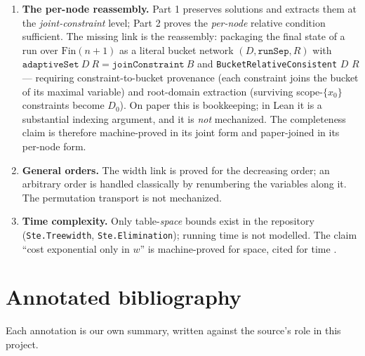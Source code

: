 \documentclass[11pt]{article}
\newcommand{\ste}[1]{\texttt{#1}}
\begin{document}
\begin{enumerate}
\item \textbf{The per-node reassembly.} Part 1 preserves solutions and
  extracts them at the \emph{joint-constraint} level; Part 2 proves
  the \emph{per-node} relative condition sufficient. The missing link
  is the reassembly: packaging the final state of a run over
  $\mathrm{Fin}(n{+}1)$ as a literal bucket network $(D, \ste{runSep},
  R)$ with $\ste{adaptiveSet}\ D\ R = \ste{joinConstraint}\ B$ and
  \ste{BucketRelativeConsistent} $D$ $R$ --- requiring
  constraint-to-bucket provenance (each constraint joins the bucket of
  its maximal variable) and root-domain extraction (surviving
  scope-$\{x_0\}$ constraints become $D_0$). On paper this is
  bookkeeping; in Lean it is a substantial indexing argument, and it
  is \emph{not} mechanized. The completeness claim is therefore
  machine-proved in its joint form and paper-joined in its per-node
  form.
\item \textbf{General orders.} The width link is proved for the
  decreasing order; an arbitrary order is handled classically by
  renumbering the variables along it. The permutation transport is not
  mechanized.
\item \textbf{Time complexity.} Only table-\emph{space} bounds exist
  in the repository (\ste{Ste.Treewidth}, \ste{Ste.Elimination});
  running time is not modelled. The claim ``cost exponential only in
  $w$'' is machine-proved for space, cited for time
  \citep{dechterpearl1987network, dechter2003constraint}.
\end{enumerate}

\section{Annotated bibliography}
\label{sec:bib}

Each annotation is our own summary, written against the source's role
in this project.
\end{document}

